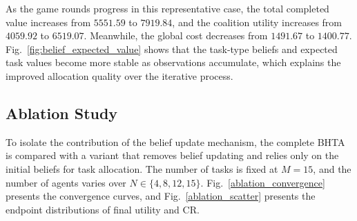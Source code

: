 \documentclass[journal,twoside,web]{ieeecolor}
\begin{document}
As the game rounds progress in this representative case, the total completed value increases from $5551.59$ to $7919.84$, and the coalition utility increases from $4059.92$ to $6519.07$. Meanwhile, the global cost decreases from $1491.67$ to $1400.77$. Fig.~\ref{fig:belief_expected_value} shows that the task-type beliefs and expected task values become more stable as observations accumulate, which explains the improved allocation quality over the iterative process.

\subsection{Ablation Study}

To isolate the contribution of the belief update mechanism, the complete BHTA is compared with a variant that removes belief updating and relies only on the initial beliefs for task allocation. The number of tasks is fixed at $M=15$, and the number of agents varies over $N\in\{4,8,12,15\}$. Fig.~\ref{ablation_convergence} presents the convergence curves, and Fig.~\ref{ablation_scatter} presents the endpoint distributions of final utility and CR.
\end{document}
